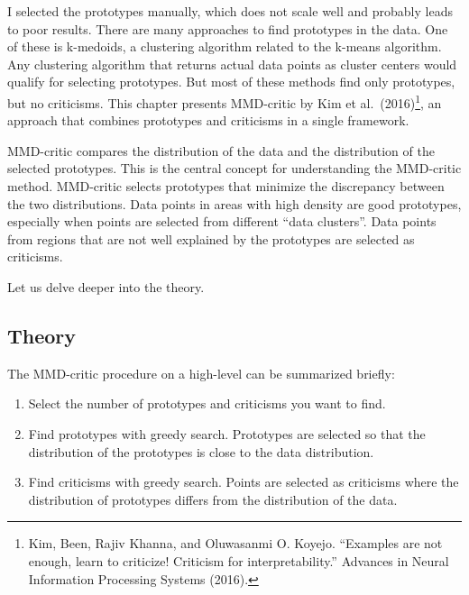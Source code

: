 \documentclass[
  11pt,
]{scrbook}
\providecommand{\tightlist}{%
  \setlength{\itemsep}{0pt}\setlength{\parskip}{0pt}}
\begin{document}
I selected the prototypes manually, which does not scale well and probably leads to poor results.
There are many approaches to find prototypes in the data.
One of these is k-medoids, a clustering algorithm related to the k-means algorithm.
Any clustering algorithm that returns actual data points as cluster centers would qualify for selecting prototypes.
But most of these methods find only prototypes, but no criticisms.
This chapter presents MMD-critic by Kim et al.~(2016)\footnote{Kim, Been, Rajiv Khanna, and Oluwasanmi O. Koyejo. ``Examples are not enough, learn to criticize! Criticism for interpretability.'' Advances in Neural Information Processing Systems (2016).}, an approach that combines prototypes and criticisms in a single framework.

MMD-critic compares the distribution of the data and the distribution of the selected prototypes.
This is the central concept for understanding the MMD-critic method.
MMD-critic selects prototypes that minimize the discrepancy between the two distributions.
Data points in areas with high density are good prototypes, especially when points are selected from different ``data clusters''.
Data points from regions that are not well explained by the prototypes are selected as criticisms.

Let us delve deeper into the theory.

\hypertarget{theory-5}{%
\subsection{Theory}\label{theory-5}}

The MMD-critic procedure on a high-level can be summarized briefly:

\begin{enumerate}
\def\labelenumi{\arabic{enumi}.}
\tightlist
\item
  Select the number of prototypes and criticisms you want to find.
\item
  Find prototypes with greedy search.
  Prototypes are selected so that the distribution of the prototypes is close to the data distribution.
\item
  Find criticisms with greedy search.
  Points are selected as criticisms where the distribution of prototypes differs from the distribution of the data.
\end{enumerate}
\end{document}
